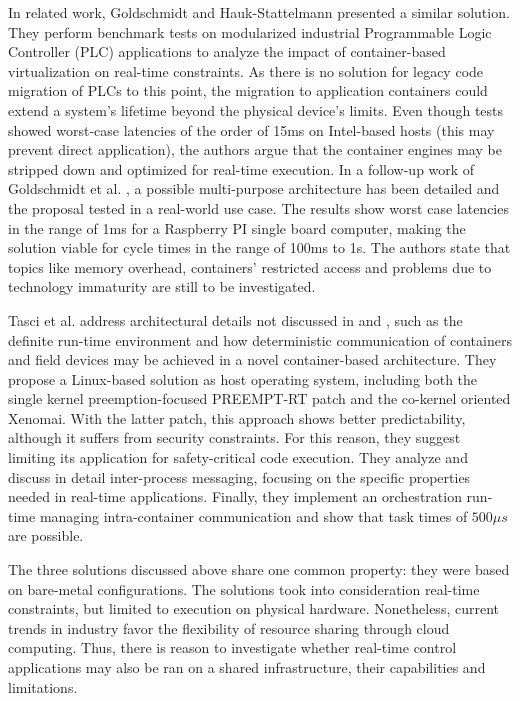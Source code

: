 \documentclass[]{scrartcl}
\begin{document}
In related work, Goldschmidt and Hauk-Stattelmann \cite{GoldschmidtHauck-Stattelmann2016} presented a similar solution.
They perform benchmark tests on modularized industrial Programmable Logic Controller (PLC) applications to analyze the impact of container-based virtualization on real-time constraints.
As there is no solution for legacy code migration of PLCs to this point, the migration to application containers could extend a system's lifetime beyond the physical device's limits.
Even though tests showed worst-case latencies of the order of 15ms on Intel-based hosts (this may prevent direct application), the authors argue that the container engines may be stripped down and optimized for real-time execution.
In a follow-up work of Goldschmidt et al. \cite{Goldschmidtetal2018}, a possible multi-purpose architecture has been detailed and the proposal tested in a real-world use case.
The results show worst case latencies in the range of 1ms for a Raspberry PI single board computer, making the solution viable for cycle times in the range of 100ms to 1s.
The authors state that topics like memory overhead, containers' restricted access and problems due to technology immaturity are still to be investigated.

Tasci et al. \cite{Tascietal2018} address architectural details not discussed in \cite{GoldschmidtHauck-Stattelmann2016} and \cite{Goldschmidtetal2018}, such as the definite run-time environment and how deterministic communication of containers and field devices may be achieved in a novel container-based architecture. 
They propose a Linux-based solution as host operating system, including both the single kernel preemption-focused PREEMPT-RT patch and the co-kernel oriented Xenomai. 
With the latter patch, this approach shows better predictability, although it suffers from security constraints. For this reason, they suggest limiting its application for safety-critical code execution. 
They analyze and discuss in detail inter-process messaging, focusing on the specific properties needed in real-time applications.
Finally, they implement an orchestration run-time managing intra-container communication and show that task times of $500\mu s$ are possible.

The three solutions discussed above share one common property: they were based on bare-metal configurations. 
The solutions took into consideration real-time constraints, but limited to execution on physical hardware.
Nonetheless, current trends in industry favor the flexibility of resource sharing through cloud computing.
Thus, there is reason to investigate whether real-time control applications may also be ran on a shared infrastructure, their capabilities and limitations.
\end{document}
